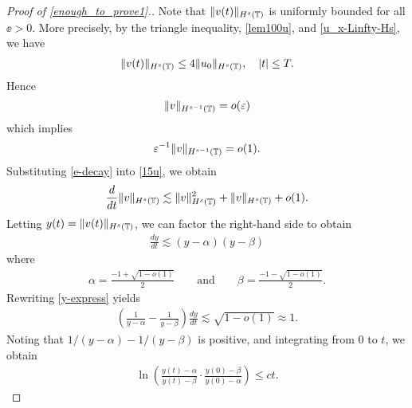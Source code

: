 \begin{proof}[Proof of \eqref{enough_to_prove1}.]
%
%
Note
that $\|v(t)\|_{H^s(\mathbb{T})}$ is uniformly bounded for all $\ee > 0$. More 
precisely, by
the triangle inequality,  \eqref{lem100u}, and \eqref{u_x-Linfty-Hs},
we have
%
%
\begin{equation}
	\label{bound-no-ep}
\begin{split}
\|v(t) \|_{H^s(\mathbb{T})}
\le 4 \|u_0\|_{H^s(\mathbb{T})}, \quad |t| \le T.
\end{split}
\end{equation}
%
%
Hence
\begin{equation*}
\|v\|_{H^{s-1}(\mathbb{T})} = o(\varepsilon)
\end{equation*}
%
%
which implies
\begin{equation}
	\label{e-decay}
	\varepsilon^{-1} \|v\|_{H^{s-1}(\mathbb{T})} = o(1).
\end{equation}
%
%
Substituting \eqref{e-decay} into \eqref{15u}, we obtain
%
%
\begin{equation}
\begin{split}
\frac{d}{dt} \|v\|_{H^s(\mathbb{T})} \lesssim
\|v\|_{H^s(\mathbb{T})}^2 + \|v\|_{H^s(\mathbb{T})} + o(1).
\label{202x}
\end{split}
\end{equation}
%
%
Letting $y(t) = \|v(t)\|_{H^s(\mathbb{T})}$, we can factor the right-hand side to 
obtain
%
%
\begin{equation}
	\label{y-express}
	\begin{split}
		\frac{dy}{dt} \lesssim (y-\alpha)(y-\beta)	
	\end{split}
\end{equation}
%
%
where
%
%
\begin{equation}
	\begin{split}
		\alpha = \frac{-1 + \sqrt{1-o(1)}}{2} \qquad \text{and} \qquad
		\beta = \frac{-1 - \sqrt{1-o(1)}}{2}.
	\end{split}
\end{equation}
%
%
Rewriting \eqref{y-express} yields
%
%
\begin{equation*}
	\begin{split}
		\left( \frac{1}{y-\alpha} - \frac{1}{y-\beta} 
		\right) \frac{dy}{dt} \lesssim \sqrt{1- o(1)} \approx 1.
	\end{split}
\end{equation*}
%
%
Noting that $1/(y - \alpha) - 1/(y - \beta)$ is positive, and integrating 
from $0$ to $t$, we obtain 
%
%
\begin{equation*}
	\begin{split}
		\ln \left (\frac{y(t) - \alpha}{y(t) - \beta} \cdot 
		\frac{y(0) - \beta}{y(0) - \alpha} \right ) \le ct.	

\end{split}
\end{equation*}
\end{proof}
